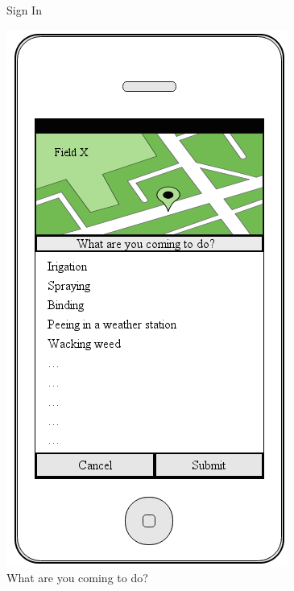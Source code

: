 \documentclass[12pt]{article}
\begin{document}
\begin{figure}[ht]
	\caption{Sign In}
	\endminipage\hfill
	\centering
	\includegraphics[width=\linewidth, height=0.4\textheight, keepaspectratio=true]{mockups/NotificationComingToDo.png}
	\caption{What are you coming to do?}
	\endminipage\hfill
	\centering

\end{figure}
\end{document}
